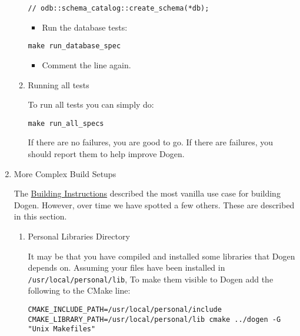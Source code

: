 \documentclass[11pt]{article}
\begin{document}
\begin{enumerate}
\begin{enumerate}
\begin{verbatim}
// odb::schema_catalog::create_schema(*db);
\end{verbatim}

\begin{itemize}
\item Run the database tests:
\end{itemize}

\begin{verbatim}
make run_database_spec
\end{verbatim}

\begin{itemize}
\item Comment the line again.
\end{itemize}

\item Running all tests
\label{sec-3-1-2-3-2}

To run all tests you can simply do:

\begin{verbatim}
make run_all_specs
\end{verbatim}

If there are no failures, you are good to go. If there are failures,
you should report them to help improve Dogen.
\end{enumerate}

\item More Complex Build Setups
\label{sec-3-1-2-4}

The \href{https://github.com/DomainDrivenConsulting/dogen/blob/master/doc/manual/manual.org#building-instructions}{Building Instructions} described the most vanilla use case for
building Dogen. However, over time we have spotted a few others. These
are described in this section.

\begin{enumerate}
\item Personal Libraries Directory
\label{sec-3-1-2-4-1}

It may be that you have compiled and installed some libraries that
Dogen depends on. Assuming your files have been installed in
\texttt{/usr/local/personal/lib}, To make them visible to Dogen add the
following to the CMake line:

\begin{verbatim}
CMAKE_INCLUDE_PATH=/usr/local/personal/include CMAKE_LIBRARY_PATH=/usr/local/personal/lib cmake ../dogen -G "Unix Makefiles"
\end{verbatim}


\end{enumerate}
\end{enumerate}
\end{document}
